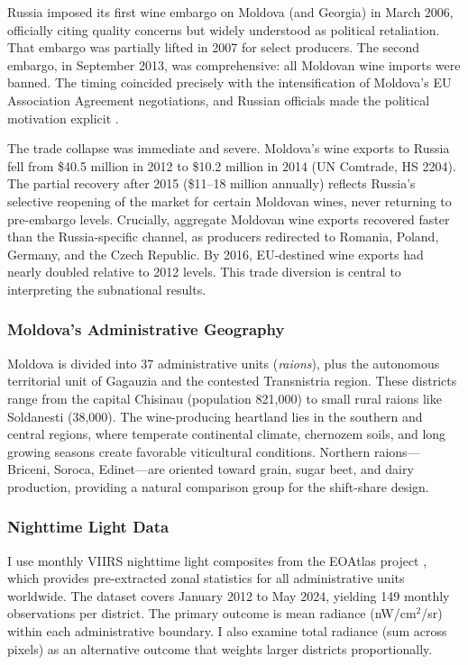 \documentclass[12pt]{article}
\begin{document}
Russia imposed its first wine embargo on Moldova (and Georgia) in March 2006, officially citing quality concerns but widely understood as political retaliation. That embargo was partially lifted in 2007 for select producers. The second embargo, in September 2013, was comprehensive: all Moldovan wine imports were banned. The timing coincided precisely with the intensification of Moldova's EU Association Agreement negotiations, and Russian officials made the political motivation explicit \citep{popescu2014moldova}.

The trade collapse was immediate and severe. Moldova's wine exports to Russia fell from \$40.5 million in 2012 to \$10.2 million in 2014 (UN Comtrade, HS 2204). The partial recovery after 2015 (\$11--18 million annually) reflects Russia's selective reopening of the market for certain Moldovan wines, never returning to pre-embargo levels. Crucially, aggregate Moldovan wine exports recovered faster than the Russia-specific channel, as producers redirected to Romania, Poland, Germany, and the Czech Republic. By 2016, EU-destined wine exports had nearly doubled relative to 2012 levels. This trade diversion is central to interpreting the subnational results.

\subsubsection*{Moldova's Administrative Geography} Moldova is divided into 37 administrative units (\textit{raions}), plus the autonomous territorial unit of Gagauzia and the contested Transnistria region. These districts range from the capital Chisinau (population 821,000) to small rural raions like Soldanesti (38,000). The wine-producing heartland lies in the southern and central regions, where temperate continental climate, chernozem soils, and long growing seasons create favorable viticultural conditions. Northern raions---Briceni, Soroca, Edinet---are oriented toward grain, sugar beet, and dairy production, providing a natural comparison group for the shift-share design.

\subsubsection*{Nighttime Light Data} I use monthly VIIRS nighttime light composites from the EOAtlas project \citep{henderson2012measuring}, which provides pre-extracted zonal statistics for all administrative units worldwide. The dataset covers January 2012 to May 2024, yielding 149 monthly observations per district. The primary outcome is mean radiance (nW/cm$^2$/sr) within each administrative boundary. I also examine total radiance (sum across pixels) as an alternative outcome that weights larger districts proportionally.
\end{document}
